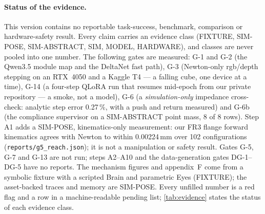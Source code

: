 \paragraph{Status of the evidence.}
This version contains no reportable task-success, benchmark, comparison or hardware-safety result.
Every claim carries an evidence class (FIXTURE, SIM-POSE, SIM-ABSTRACT, SIM, MODEL, HARDWARE), and classes are never pooled into one number.
The following gates are measured: G-1 and G-2 (the Qwen3.5 module map and the DeltaNet fast path), G-3 (Newton-only rgb/depth stepping on an RTX~4050 and a Kaggle T4 --- a falling cube, one device at a time), G-14 (a four-step QLoRA run that resumes mid-epoch from our private repository --- a smoke, not a model), G-6 (a \emph{simulation-only} impedance cross-check: analytic step error 0.27\,\%, with a push and return measured) and G-6b (the compliance supervisor on a SIM-ABSTRACT point mass, 8 of 8 rows).
Step A1 adds a SIM-POSE, kinematics-only measurement: our FR3 flange forward kinematics agrees with Newton to within 0.00224\,mm over 102 configurations (\texttt{reports/g5\_reach.json}); it is not a manipulation or safety result.
Gates G-5, G-7 and G-13 are not run; steps A2--A10 and the data-generation gates DG-1--DG-5 have no reports.
The mechanism figures and appendix~F come from a symbolic fixture with a scripted Brain and parametric Eyes (FIXTURE); the asset-backed traces and memory are SIM-POSE.
Every unfilled number is a red flag and a row in a machine-readable pending list; \cref{tab:evidence} states the status of each evidence class.
